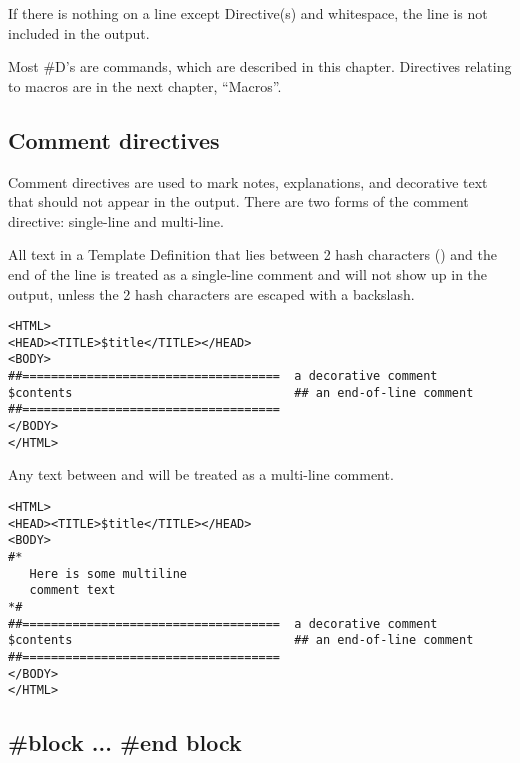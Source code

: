 
If there is nothing on a line except Directive(s) and whitespace, the line is
not included in the output.


Most \#D's are commands, which are described in this chapter.  Directives
relating to macros are in the next chapter, ``Macros''.


\subsection{Comment directives}

Comment directives are used to mark notes, explanations, and decorative text
that should not appear in the output.  There are two forms of the comment
directive: single-line and multi-line.

All text in a Template Definition that lies between 2 hash characters
(\code{\#\#}) and the end of the line is treated as a single-line comment and
will not show up in the output, unless the 2 hash characters are escaped with a
backslash.
\begin{verbatim}
<HTML>
<HEAD><TITLE>$title</TITLE></HEAD>
<BODY>
##====================================  a decorative comment
$contents                               ## an end-of-line comment
##====================================
</BODY>
</HTML>
\end{verbatim}

Any text between \code{\#*} and \code{*\#} will be treated as a multi-line
comment.
\begin{verbatim}
<HTML>
<HEAD><TITLE>$title</TITLE></HEAD>
<BODY>
#*
   Here is some multiline
   comment text
*#
##====================================  a decorative comment
$contents                               ## an end-of-line comment
##====================================
</BODY>
</HTML>
\end{verbatim}


\subsection{\#block ... \#end block}


